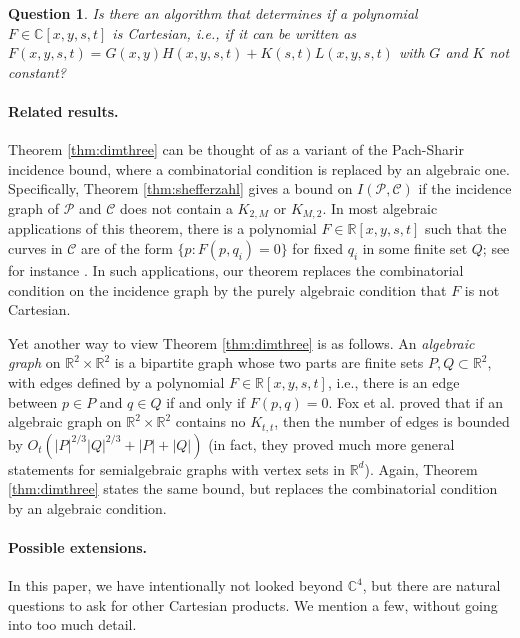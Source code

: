 \documentclass{daj}
\newtheorem{question}[theorem]{Question}
\theoremstyle{definition}
\newcommand{\C}{\mathbb C}
\newcommand{\R}{\mathbb R}
\newcommand{\pts}{\mathcal P}
\newcommand{\cvs}{\mathcal C}
\begin{document}
\begin{question}
Is there an algorithm that determines if a polynomial $F\in \C[x,y,s,t]$ is Cartesian, i.e., if it can be written as $F(x,y,s,t) = G(x,y)H(x,y,s,t) + K(s,t)L(x,y,s,t)$ with $G$ and $K$ not constant?
\end{question}


\paragraph{Related results.}
Theorem \ref{thm:dimthree} can be thought of as a variant of the Pach-Sharir incidence bound, where a combinatorial condition is replaced by an algebraic one.
Specifically, Theorem \ref{thm:shefferzahl} gives a bound on $I(\pts,\cvs)$ if the incidence graph of $\pts$ and $\cvs$ does not contain a $K_{2,M}$ or $K_{M,2}$.
In most algebraic applications of this theorem, there is a polynomial $F\in \R[x,y,s,t]$ such that the curves in $\cvs$ are of the form $\{p:F(p,q_i)=0\}$ for fixed $q_i$ in some finite set $Q$; see for instance \cite{RSS, SSS,Sh}.
In such applications, our theorem replaces the combinatorial condition on the incidence graph by the purely algebraic condition that $F$ is not Cartesian.

Yet another way to view Theorem \ref{thm:dimthree} is as follows.
An \emph{algebraic graph} on $\R^2\times \R^2$ is a bipartite graph whose two parts are finite sets $P,Q\subset \R^2$, with edges defined by a polynomial $F\in \R[x,y,s,t]$, i.e., there is an edge between $p\in P$ and $q\in Q$ if and only if $F(p,q)=0$.
Fox et al. \cite{FPSSZ} proved that if an algebraic graph on $\R^2\times \R^2$ contains no $K_{t,t}$, then the number of edges is bounded by $O_t(|P|^{2/3}|Q|^{2/3}+|P|+|Q|)$ (in fact, they proved much more general statements for semialgebraic graphs with vertex sets in $\R^d$).
Again, Theorem \ref{thm:dimthree} states the same bound, but replaces the combinatorial condition by an algebraic condition.



\paragraph{Possible extensions.}
In this paper, we have intentionally not looked beyond $\C^4$, but there are natural questions to ask for other Cartesian products. We mention a few, without going into too much detail.
\end{document}
